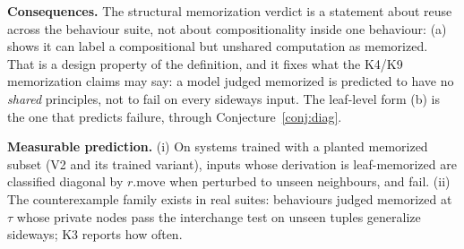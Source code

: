\textbf{Consequences.} The structural memorization verdict is a statement
about reuse across the behaviour suite, not about compositionality inside one
behaviour: (a) shows it can label a compositional but unshared computation as
memorized. That is a design property of the definition, and it fixes what the
K4/K9 memorization claims may say: a model judged memorized is predicted to
have no \emph{shared} principles, not to fail on every sideways input. The
leaf-level form (b) is the one that predicts failure, through
Conjecture~\ref{conj:diag}.

\textbf{Measurable prediction.} (i) On systems trained with a planted
memorized subset (V2 and its trained variant), inputs whose derivation is
leaf-memorized are classified diagonal by $r.\mathrm{move}$ when perturbed to
unseen neighbours, and fail. (ii) The counterexample family exists in real
suites: behaviours judged memorized at $\tau$ whose private nodes pass the
interchange test on unseen tuples generalize sideways; K3 reports how often.
